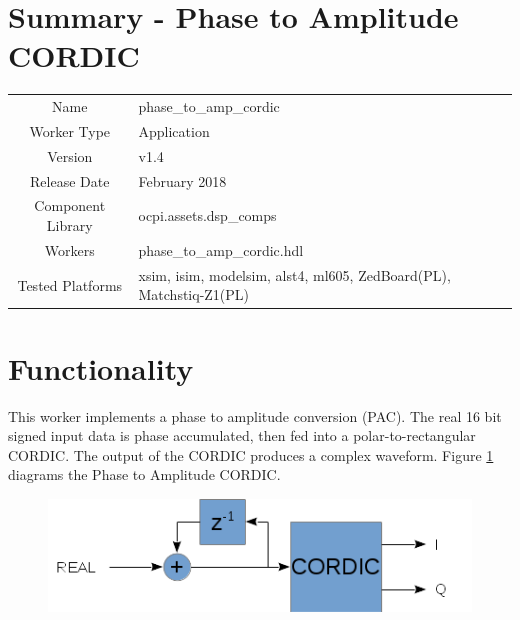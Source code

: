 \documentclass{article}
\author{} %
\date{Version \docVersion} %
\title{\docTitle}
\def\docVersion{1.4}
\def\comp{phase\_to\_amp\_cordic}
\def\Comp{Phase to Amplitude CORDIC}
\begin{document}
\section*{Summary - \Comp}
\begin{tabular}{|c|M{13.5cm}|}
	\hline
	                  &                                                    \\
	\hline
	Name              & \comp                                              \\
	\hline
	Worker Type       & Application                                        \\
	\hline
	Version           & v\docVersion \\
	\hline
	Release Date      & February 2018 \\
	\hline
	Component Library & ocpi.assets.dsp\_comps                              \\
	\hline
	Workers           & \comp.hdl                                          \\
	\hline
	Tested Platforms  & xsim, isim, modelsim, alst4, ml605, ZedBoard(PL), Matchstiq-Z1(PL) \\
	\hline
\end{tabular}

\section*{Functionality}
\begin{flushleft}
	This worker implements a phase to amplitude conversion (PAC). The real 16 bit signed input data is phase accumulated, then fed into a polar-to-rectangular CORDIC. The output of the CORDIC produces a complex waveform. Figure \ref{fig:phase_to_amp_cordic} diagrams the Phase to Amplitude CORDIC.

	\begin{figure}[h]
		\centering\captionsetup{type=figure}\includegraphics[scale=0.8]{phase_to_amp_cordic_block_diagram}
		\label{fig:phase_to_amp_cordic}
	\end{figure}
\end{flushleft}
\end{document}
